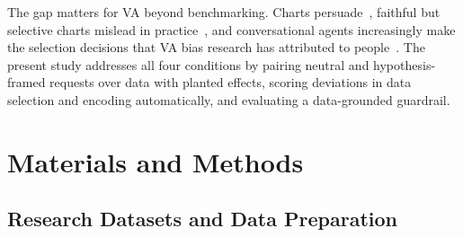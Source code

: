 \documentclass[conference]{IEEEtran}
\begin{document}
The gap matters for VA beyond benchmarking. Charts persuade~\cite{pandey2014}, faithful but selective charts mislead in practice~\cite{lisnic2023}, and conversational agents increasingly make the selection decisions that VA bias research has attributed to people~\cite{narechania2022,hong2025}. The present study addresses all four conditions by pairing neutral and hypothesis-framed requests over data with planted effects, scoring deviations in data selection and encoding automatically, and evaluating a data-grounded guardrail.

\section{Materials and Methods}\label{sec:methods}

\subsection{Research Datasets and Data Preparation}\label{sec:data}
\end{document}

